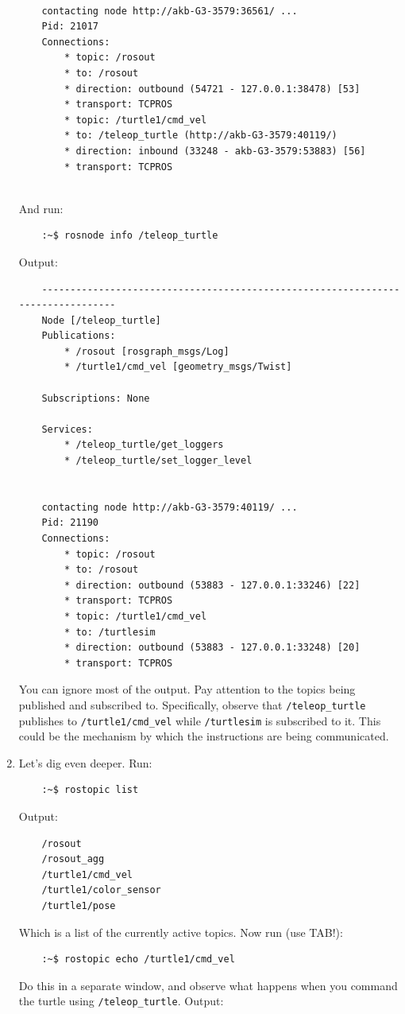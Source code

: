 \documentclass{article}
\begin{document}
\begin{enumerate}
\begin{verbatim}
    
    contacting node http://akb-G3-3579:36561/ ...
    Pid: 21017
    Connections:
        * topic: /rosout
        * to: /rosout
        * direction: outbound (54721 - 127.0.0.1:38478) [53]
        * transport: TCPROS
        * topic: /turtle1/cmd_vel
        * to: /teleop_turtle (http://akb-G3-3579:40119/)
        * direction: inbound (33248 - akb-G3-3579:53883) [56]
        * transport: TCPROS
    
        \end{verbatim}
        And run:
        \begin{verbatim}
    :~$ rosnode info /teleop_turtle
        \end{verbatim}
        Output:
        \begin{verbatim}
    --------------------------------------------------------------------------------
    Node [/teleop_turtle]
    Publications: 
        * /rosout [rosgraph_msgs/Log]
        * /turtle1/cmd_vel [geometry_msgs/Twist]
    
    Subscriptions: None
    
    Services: 
        * /teleop_turtle/get_loggers
        * /teleop_turtle/set_logger_level
    
    
    contacting node http://akb-G3-3579:40119/ ...
    Pid: 21190
    Connections:
        * topic: /rosout
        * to: /rosout
        * direction: outbound (53883 - 127.0.0.1:33246) [22]
        * transport: TCPROS
        * topic: /turtle1/cmd_vel
        * to: /turtlesim
        * direction: outbound (53883 - 127.0.0.1:33248) [20]
        * transport: TCPROS
        \end{verbatim}
        You can ignore most of the output. Pay attention to the topics being published
        and subscribed to. Specifically, observe that \texttt{/teleop\_turtle} publishes 
        to \texttt{/turtle1/cmd\_vel} while \texttt{/turtlesim} is subscribed to it. This could be 
        the mechanism by which the instructions are being communicated.

        \item Let's dig even deeper. Run:
        \begin{verbatim}
    :~$ rostopic list    
        \end{verbatim}
        Output:
        \begin{verbatim}
    /rosout
    /rosout_agg
    /turtle1/cmd_vel
    /turtle1/color_sensor
    /turtle1/pose
        \end{verbatim}
        Which is a list of the currently active topics. Now run (use TAB!):
        \begin{verbatim}
    :~$ rostopic echo /turtle1/cmd_vel
        \end{verbatim}
        Do this in a separate window, and observe what happens when you command the turtle using
        \texttt{/teleop\_turtle}. Output:
        \begin{verbatim}
    

\end{verbatim}
\end{enumerate}
\end{document}

